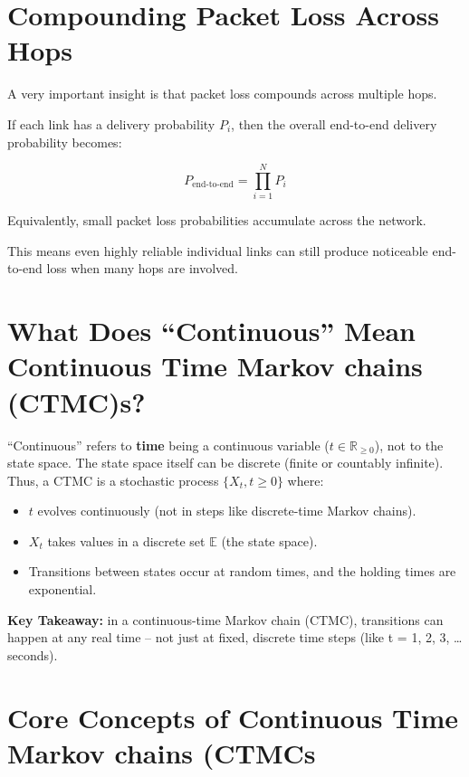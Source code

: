 \section{Compounding Packet Loss Across Hops}

A very important insight is that packet loss compounds across multiple hops.

If each link has a delivery probability $P_i$, then the overall end-to-end
delivery probability becomes:

\[
P_{\text{end-to-end}} = \prod_{i=1}^{N} P_i
\]

Equivalently, small packet loss probabilities accumulate across the network.

This means even highly reliable individual links can still produce noticeable
end-to-end loss when many hops are involved.

\clearpage

\section*{What Does ``Continuous'' Mean Continuous Time Markov chains (CTMC)s?}

``Continuous'' refers to \textbf{time} being a continuous variable (\(t \in \mathbb{R}_{\ge 0}\)), not to the state space. 
The state space itself can be discrete (finite or countably infinite). 
Thus, a CTMC is a stochastic process \(\{X_t, t \ge 0\}\) where:
\begin{itemize}
    \item \(t\) evolves continuously (not in steps like discrete-time Markov chains).
    \item \(X_t\) takes values in a discrete set \(\mathbb{E}\) (the state space).
    \item Transitions between states occur at random times, and the holding times are exponential.
\end{itemize}
\vspace{0.3cm}
\begin{mdframed}[backgroundcolor=lightgray, linewidth=0pt, innertopmargin=8pt,
innerbottommargin=8pt]
\textbf{Key Takeaway:} in a continuous-time Markov chain (CTMC), transitions can happen at any real time – not just at fixed, discrete time steps (like t = 1, 2, 3, … seconds).
\end{mdframed}
\section*{Core Concepts of Continuous Time Markov chains (CTMCs}

